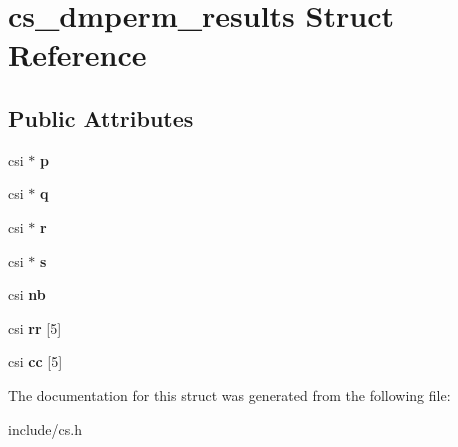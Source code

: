 \hypertarget{structcs__dmperm__results}{\section{cs\+\_\+dmperm\+\_\+results Struct Reference}
\label{structcs__dmperm__results}
}
\subsection*{Public Attributes}
\begin{DoxyCompactItemize}
\item 
\hypertarget{structcs__dmperm__results_aa1cdef46dad146c0d64d64dbda23f44e}{csi $\ast$ {\bfseries p}}\label{structcs__dmperm__results_aa1cdef46dad146c0d64d64dbda23f44e}

\item 
\hypertarget{structcs__dmperm__results_a76216ad1101a5b930eaf062ae3d48c99}{csi $\ast$ {\bfseries q}}\label{structcs__dmperm__results_a76216ad1101a5b930eaf062ae3d48c99}

\item 
\hypertarget{structcs__dmperm__results_a193ebe355ad15e9408fdf705e197833f}{csi $\ast$ {\bfseries r}}\label{structcs__dmperm__results_a193ebe355ad15e9408fdf705e197833f}

\item 
\hypertarget{structcs__dmperm__results_a6dd273f5ba6466e85e5ac158703911d0}{csi $\ast$ {\bfseries s}}\label{structcs__dmperm__results_a6dd273f5ba6466e85e5ac158703911d0}

\item 
\hypertarget{structcs__dmperm__results_aecf39880909b599bcbf205e214e99354}{csi {\bfseries nb}}\label{structcs__dmperm__results_aecf39880909b599bcbf205e214e99354}

\item 
\hypertarget{structcs__dmperm__results_a553659515b7ea8657cec9e434f4f0c3a}{csi {\bfseries rr} \mbox{[}5\mbox{]}}\label{structcs__dmperm__results_a553659515b7ea8657cec9e434f4f0c3a}

\item 
\hypertarget{structcs__dmperm__results_a7078a0543f4ad701596e75c1f2055813}{csi {\bfseries cc} \mbox{[}5\mbox{]}}\label{structcs__dmperm__results_a7078a0543f4ad701596e75c1f2055813}

\end{DoxyCompactItemize}


The documentation for this struct was generated from the following file\+:\begin{DoxyCompactItemize}
\item 
include/cs.\+h\end{DoxyCompactItemize}
